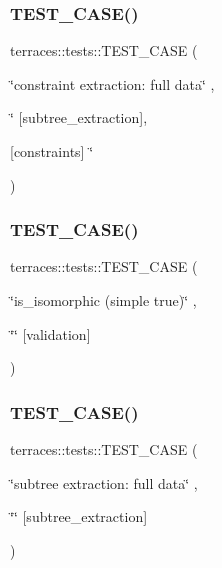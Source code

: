 \subsubsection{\texorpdfstring{T\+E\+S\+T\+\_\+\+C\+A\+S\+E()}{TEST\_CASE()}\hspace{0.1cm}{\footnotesize\ttfamily [11/78]}}
{\footnotesize\ttfamily terraces\+::tests\+::\+T\+E\+S\+T\+\_\+\+C\+A\+SE (\begin{DoxyParamCaption}\item[{\char`\"{}constraint extraction\+: full data\char`\"{}}]{,  }\item[{\char`\"{}}]{\mbox{[}subtree\+\_\+extraction\mbox{]},  }\item[{\mbox{[}constraints\mbox{]} \char`\"{}}]{ }\end{DoxyParamCaption})}

\mbox{\label{namespaceterraces_1_1tests_ad56c940f333832b8ab78bb33d36c4db5}} 
\subsubsection{\texorpdfstring{T\+E\+S\+T\+\_\+\+C\+A\+S\+E()}{TEST\_CASE()}\hspace{0.1cm}{\footnotesize\ttfamily [12/78]}}
{\footnotesize\ttfamily terraces\+::tests\+::\+T\+E\+S\+T\+\_\+\+C\+A\+SE (\begin{DoxyParamCaption}\item[{\char`\"{}is\+\_\+isomorphic (simple true)\char`\"{}}]{,  }\item[{\char`\"{}\char`\"{}}]{\mbox{[}validation\mbox{]} }\end{DoxyParamCaption})}

\mbox{\label{namespaceterraces_1_1tests_a12fc00cd878f7c90703839206ef2e8f3}} 
\subsubsection{\texorpdfstring{T\+E\+S\+T\+\_\+\+C\+A\+S\+E()}{TEST\_CASE()}\hspace{0.1cm}{\footnotesize\ttfamily [13/78]}}
{\footnotesize\ttfamily terraces\+::tests\+::\+T\+E\+S\+T\+\_\+\+C\+A\+SE (\begin{DoxyParamCaption}\item[{\char`\"{}subtree extraction\+: full data\char`\"{}}]{,  }\item[{\char`\"{}\char`\"{}}]{\mbox{[}subtree\+\_\+extraction\mbox{]} }\end{DoxyParamCaption})}

